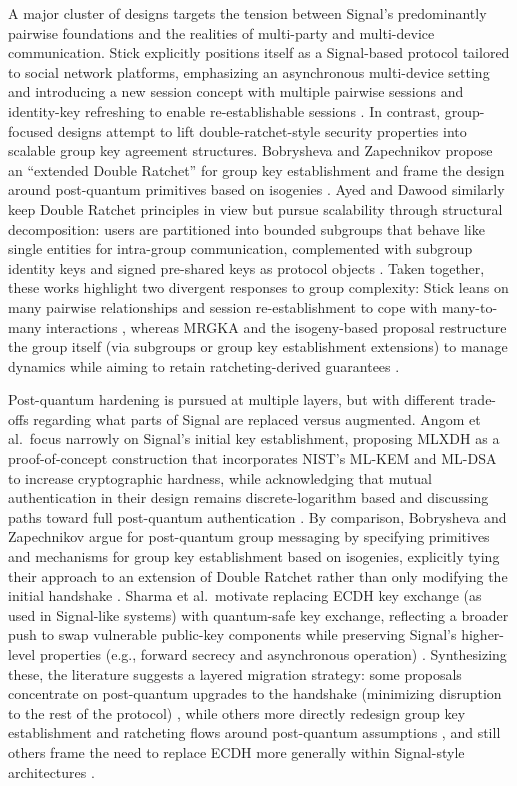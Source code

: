 A major cluster of designs targets the tension between Signal’s predominantly pairwise foundations and the realities of multi-party and multi-device communication. Stick explicitly positions itself as a Signal-based protocol tailored to social network platforms, emphasizing an asynchronous multi-device setting and introducing a new session concept with multiple pairwise sessions and identity-key refreshing to enable re-establishable sessions \cite{basem2023}. In contrast, group-focused designs attempt to lift double-ratchet-style security properties into scalable group key agreement structures. Bobrysheva and Zapechnikov propose an ``extended Double Ratchet'' for group key establishment and frame the design around post-quantum primitives based on isogenies \cite{bobrysheva2021}. Ayed and Dawood similarly keep Double Ratchet principles in view but pursue scalability through structural decomposition: users are partitioned into bounded subgroups that behave like single entities for intra-group communication, complemented with subgroup identity keys and signed pre-shared keys as protocol objects \cite{ayed2025}. Taken together, these works highlight two divergent responses to group complexity: Stick leans on many pairwise relationships and session re-establishment to cope with many-to-many interactions \cite{basem2023}, whereas MRGKA and the isogeny-based proposal restructure the group itself (via subgroups or group key establishment extensions) to manage dynamics while aiming to retain ratcheting-derived guarantees \cite{ayed2025,bobrysheva2021}.

Post-quantum hardening is pursued at multiple layers, but with different trade-offs regarding what parts of Signal are replaced versus augmented. Angom et al.\ focus narrowly on Signal’s initial key establishment, proposing MLXDH as a proof-of-concept construction that incorporates NIST’s ML-KEM and ML-DSA to increase cryptographic hardness, while acknowledging that mutual authentication in their design remains discrete-logarithm based and discussing paths toward full post-quantum authentication \cite{angom2025}. By comparison, Bobrysheva and Zapechnikov argue for post-quantum group messaging by specifying primitives and mechanisms for group key establishment based on isogenies, explicitly tying their approach to an extension of Double Ratchet rather than only modifying the initial handshake \cite{bobrysheva2021}. Sharma et al.\ motivate replacing ECDH key exchange (as used in Signal-like systems) with quantum-safe key exchange, reflecting a broader push to swap vulnerable public-key components while preserving Signal’s higher-level properties (e.g., forward secrecy and asynchronous operation) \cite{sharma2023}. Synthesizing these, the literature suggests a layered migration strategy: some proposals concentrate on post-quantum upgrades to the handshake (minimizing disruption to the rest of the protocol) \cite{angom2025}, while others more directly redesign group key establishment and ratcheting flows around post-quantum assumptions \cite{bobrysheva2021}, and still others frame the need to replace ECDH more generally within Signal-style architectures \cite{sharma2023}.

